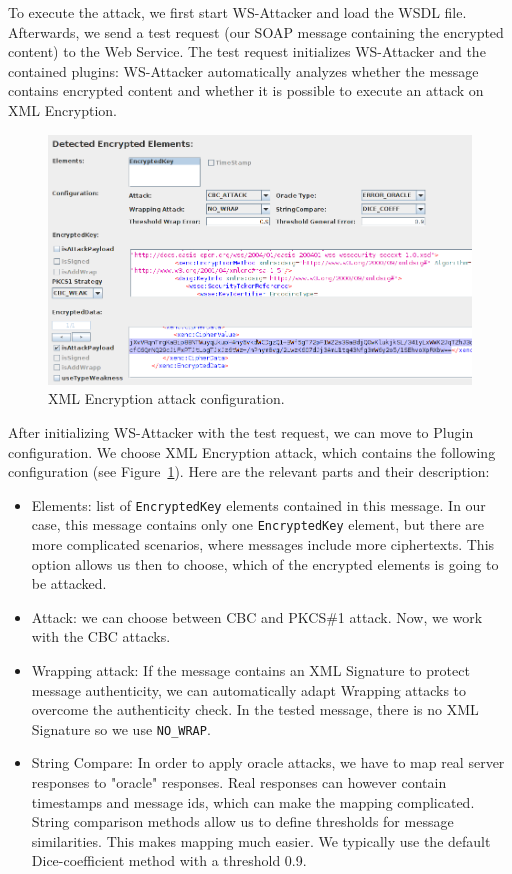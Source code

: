To execute the attack, we first start WS-Attacker and load the WSDL file. 
Afterwards, we send a test request (our SOAP message containing the encrypted content) to the Web Service. The test request initializes WS-Attacker and the contained plugins: WS-Attacker automatically analyzes whether the message contains encrypted content and whether it is possible to execute an attack on XML Encryption.

\begin{figure}[!ht]
    \centering
    \includegraphics[width=0.95\linewidth]{img/xenc-config1}
    \caption{XML Encryption attack configuration.}
    \label{fig:xenc-config1}
\end{figure}

After initializing WS-Attacker with the test request, we can move to Plugin configuration. We choose XML Encryption attack, which contains the following configuration (see Figure~\ref{fig:xenc-config1}). Here are the relevant parts and their description:

 \begin{itemize}
  \item Elements: list of \texttt{EncryptedKey} elements contained in this message. In our case, this message contains only one \texttt{EncryptedKey} element, but there are more complicated scenarios, where messages include more ciphertexts. This option allows us then to choose, which of the encrypted elements is going to be attacked.
  \item Attack: we can choose between CBC and PKCS\#1 attack. Now, we work with the CBC attacks.
  \item Wrapping attack: If the message contains an XML Signature to protect message authenticity, we can automatically adapt Wrapping attacks to overcome the authenticity check. In the tested message, there is no XML Signature so we use \texttt{NO\_WRAP}.
  \item String Compare: In order to apply oracle attacks, we have to map real server responses to "oracle" responses. Real responses can however contain timestamps and message ids, which can make the mapping complicated. String comparison methods allow us to define thresholds for message similarities. This makes mapping much easier. We typically use the default Dice-coefficient method with a threshold 0.9.
 \end{itemize}

